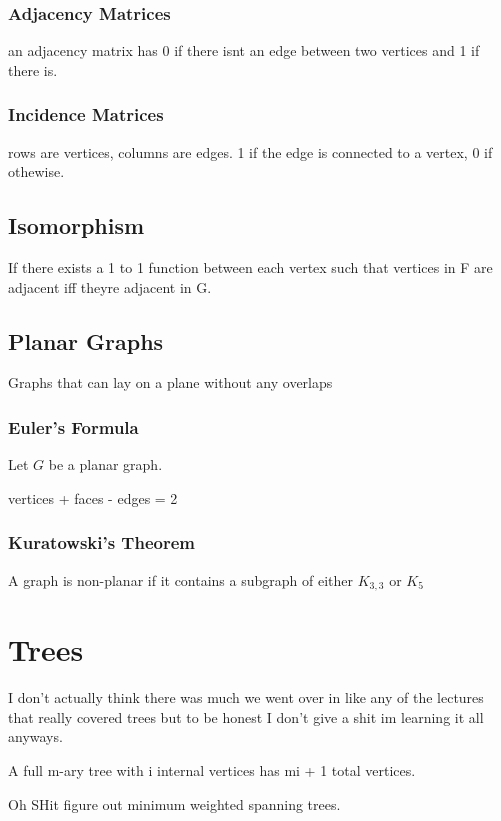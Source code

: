 \documentclass{report}
\begin{document}
\subsection{Adjacency Matrices}
an adjacency matrix has 0 if there isnt an edge between two vertices and 1 if there is.

\subsection{Incidence Matrices}
rows are vertices, columns are edges. 1 if the edge is connected to a vertex, 0 if othewise.

\section{Isomorphism}
If there exists a 1 to 1 function between each vertex such that vertices in F are adjacent iff theyre adjacent in G.


\section{Planar Graphs}
Graphs that can lay on a plane without any overlaps

\subsection{Euler's Formula}
Let $G$ be a planar graph.
\begin{center}
vertices + faces - edges = 2
\end{center}


\subsection{Kuratowski's Theorem}
A graph is non-planar if it contains a subgraph of either $K_{3, 3}$ or $K_5$

\chapter{Trees}
I don't actually think there was much we went over in like any of the lectures that really covered trees but to be honest I don't give a shit im learning it all anyways.

A full m-ary tree with i internal vertices has mi + 1 total vertices.

Oh SHit figure out minimum weighted spanning trees.
\end{document}
